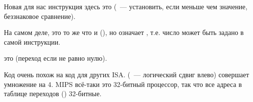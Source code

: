 


Новая для нас инструкция здесь это  (~--- установить,
если меньше чем значение, беззнаковое сравнение).

На самом деле, это то же что и  (), но  означает ,
т.е. число может быть задано в самой инструкции.

 это  (переход если не равно нулю).

Код очень похож на код для других \ac{ISA}.
 (~--- логический сдвиг влево) совершает умножение на 4.
MIPS всё-таки это 32-битный процессор, так что все адреса в таблице переходов () 32-битные.

